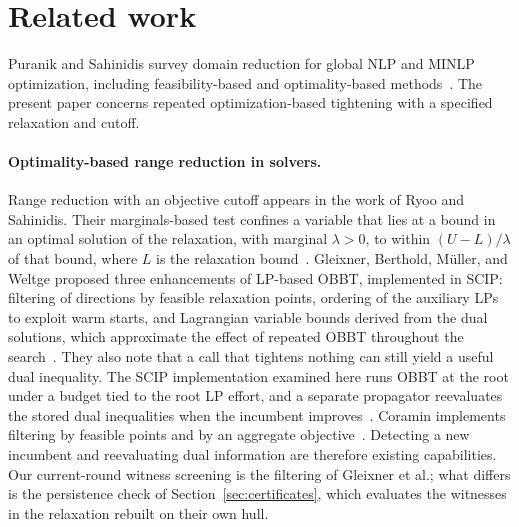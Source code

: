 \section{Related work}\label{sec:related}

Puranik and Sahinidis survey domain reduction for global NLP and MINLP
optimization, including feasibility-based and optimality-based
methods~\cite{puranik2017-domain-reduction-techniques-for-global}. The present
paper concerns repeated optimization-based tightening with a specified
relaxation and cutoff.

\paragraph{Optimality-based range reduction in solvers.} Range reduction
with an objective cutoff appears in the work of Ryoo and Sahinidis. Their
marginals-based test confines a variable that lies at a bound in an optimal
solution of the relaxation, with marginal $\lambda>0$, to within
$(U-L)/\lambda$ of that bound, where $L$ is the relaxation
bound~\cite{ryoo1995-global-optimization-of-nonconvex-nlps}. Gleixner,
Berthold, M\"uller, and Weltge proposed three enhancements of LP-based OBBT,
implemented in SCIP: filtering of directions by feasible relaxation points,
ordering of the auxiliary LPs to exploit warm starts, and Lagrangian
variable bounds derived from the dual solutions, which approximate the
effect of repeated OBBT throughout the
search~\cite{gleixner2017-three-enhancements-for-optimization-based}. They
also note that a call that tightens nothing can still yield a useful dual
inequality. The SCIP implementation examined here runs OBBT at the root under a
budget tied to the root LP effort, and a separate propagator reevaluates the
stored dual inequalities when the incumbent improves~\cite{scip2026obbt}.
Coramin implements filtering by feasible points and by an aggregate
objective~\cite{coramin2023filters}. Detecting a new incumbent and
reevaluating dual information are therefore existing capabilities. Our
current-round witness screening is the filtering of Gleixner et al.; what
differs is the persistence check of Section~\ref{sec:certificates}, which
evaluates the witnesses in the relaxation rebuilt on their own hull.

